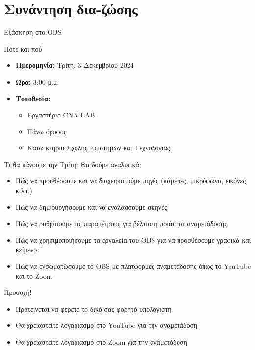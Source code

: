 \documentclass[aspectratio=169]{beamer}
\begin{document}
\section{Συνάντηση δια-ζώσης}
\begin{frame}[allowframebreaks]{Εξάσκηση στο OBS}
  \begin{alertblock}{Πότε και πού}
    \begin{itemize}
      \item \textbf{Ημερομηνία:} Τρίτη, 3 Δεκεμβρίου 2024
      \item \textbf{Ώρα:} 3:00 μ.μ.
      \item \textbf{Τοποθεσία:}
            \begin{itemize}
              \item Εργαστήριο CNA LAB
              \item Πάνω όροφος
              \item Κάτω κτήριο Σχολής Επιστημών και Τεχνολογίας
            \end{itemize}
    \end{itemize}
  \end{alertblock}
  \begin{exampleblock}{Τι θα κάνουμε την Τρίτη;}
    Θα δούμε αναλυτικά:
    \begin{itemize}
      \item Πώς να προσθέσουμε και να διαχειριστούμε πηγές (κάμερες, μικρόφωνα, εικόνες, κ.λπ.)
      \item Πώς να δημιουργήσουμε και να εναλάσσουμε σκηνές
      \item Πώς να ρυθμίσουμε τις παραμέτρους για βέλτιστη ποιότητα αναμετάδοσης
      \item Πώς να χρησιμοποιήσουμε τα εργαλεία του OBS για να προσθέσουμε γραφικά και κείμενο
      \item Πώς να ενσωματώσουμε το OBS με πλατφόρμες αναμετάδοσης όπως το YouTube και το Zoom
    \end{itemize}
  \end{exampleblock}
  \begin{alertblock}
    {Προσοχή!}
    \begin{itemize}
      \item Προτείνεται να φέρετε το δικό σας φορητό υπολογιστή
      \item Θα χρειαστείτε λογαριασμό στο YouTube για την αναμετάδοση
      \item Θα χρειαστείτε λογαριασμό στο Zoom για την αναμετάδοση
    \end{itemize}
  \end{alertblock}
\end{frame}
\end{document}

